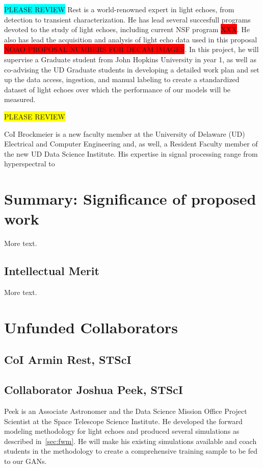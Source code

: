 \documentclass{proposalnsf}
\newcommand{\armin}[1]{\colorbox{cyan}{#1}}
\newcommand{\austin}[1]{\colorbox{yellow}{#1}}
\begin{document}
\armin{PLEASE REVIEW}
Rest is a world-renowned expert in light echoes, from detection to transient characterization. He has lead several succesfull programs devoted to the study of light echoes, including current NSF program \colorbox{red}{XXX}. He also has lead the acquisition and analysis of light echo data used in this proposal \colorbox{red}{NOAO PROPOSAL NUMBERS FOR DECAM IMAGES}. In this project, he will supervise a Graduate student from John Hopkins University in year 1, as well as co-advising the UD Graduate students in developing a detailed work plan and set up the data access, ingestion, and manual labeling to create a standardized dataset of light echoes over which the performance of our models will be measured.   

\austin{PLEASE REVIEW}

CoI Brockmeier is a new faculty member at the University of Delaware (UD) Electrical and Computer Engineering and,  as well, a Resident Faculty member of the new UD Data Science Institute. His expertise in signal processing range from hyperspectral to 

\section{Summary:  Significance of proposed work}

More text.

\subsection{Intellectual Merit}

More text.
\section{Unfunded Collaborators}

\subsection{CoI Armin Rest, STScI}




\subsection{Collaborator Joshua Peek, STScI}
Peek is an Associate Astronomer and the Data Science Mission Office Project Scientist at the Space Telescope Science Institute. He developed the forward modeling methodology for light echoes and produced several simulations as described in~\autoref{sec:fwm}. He will make his existing simulations available and coach students in the methodology to create a comprehensive training sample to be fed to our GANs. 
\end{document}
